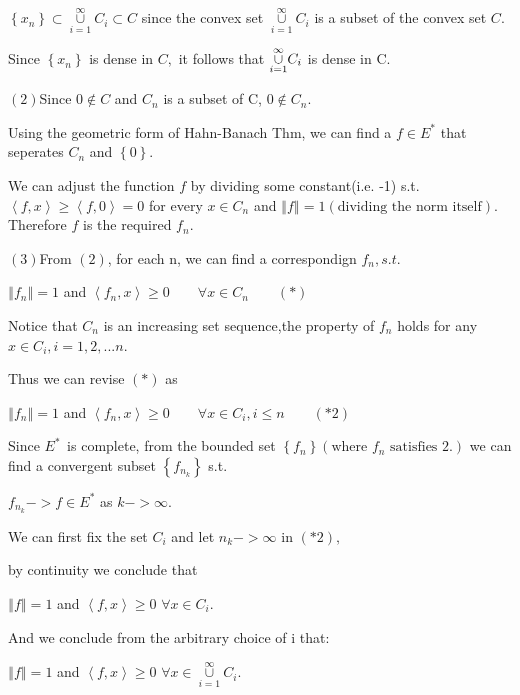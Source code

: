 \documentclass{article}
\begin{document}
$\left\{ x_{n}\right\} \subset \underset{i=1}{\overset{\infty }{\cup }}%
C_{i}\subset C$ since the convex set $\underset{i=1}{\overset{\infty }{\cup }%
}C_{i}$ is a subset of the convex set $C.$

Since $\left\{ x_{n}\right\} $ is dense in $C,$ it follows that $\underset{%
i=1}{\overset{\infty }{\cup }}C_{i}$ is dense in C.


$\left( 2\right) $Since $0\notin C$ and $C_{n}$ is a subset of C, 0$\notin
C_{n}.$

Using the geometric form of Hahn-Banach Thm, we can find a $f\in E^{\ast }$
that seperates $C_{n}$ and $\left\{ 0\right\} .$

We can adjust the function $f$ by dividing some constant(i.e. -1) s.t. $%
\left\langle f,x\right\rangle \geq \left\langle f,0\right\rangle =0$ for
every $x\in C_{n}$ and $\left\Vert f\right\Vert =1\left( \text{dividing the
norm itself}\right) .$Therefore $f$ is the required $f_{n}.$

$\left( 3\right) $From $\left( 2\right) $, for each n, we can find a
correspondign $f_{n},s.t.$

$\left\Vert f_{n}\right\Vert =1$ and $\left\langle f_{n},x\right\rangle \geq
0\qquad \forall x\in C_{n}\qquad \left( \ast \right) $

Notice that $C_{n}$ is an increasing set sequence,the property of $f_{n}$
holds for any $x\in C_{i},i=1,2,...n$. 

Thus we can revise $\left( \ast \right) $ as

$\left\Vert f_{n}\right\Vert =1$ and $\left\langle f_{n},x\right\rangle \geq
0\qquad \forall x\in C_{i},i\leq n\qquad \left( \ast 2\right) $

Since $E^{\ast \text{ }}$is complete, from the bounded set $\left\{
f_{n}\right\} \left( \text{where }f_{n}\text{ satisfies 2.}\right) $ we can
find a convergent subset $\left\{ f_{n_{k}}\right\} $ s.t. 

$f_{n_{k}}->f\in E^{\ast }$ as $k->\infty .$

We can first fix the set $C_{i}$ and let $n_{k}->\infty $ in $\left( \ast
2\right) ,$

by continuity we conclude that 

$\left\Vert f\right\Vert =1$ and $\left\langle f,x\right\rangle \geq 0$ $%
\forall x\in C_{i}.$

And we conclude from the arbitrary choice of i that:

$\left\Vert f\right\Vert =1$ and $\left\langle f,x\right\rangle \geq 0$ $%
\forall x\in \underset{i=1}{\overset{\infty }{\cup }}C_{i}.$
\end{document}

